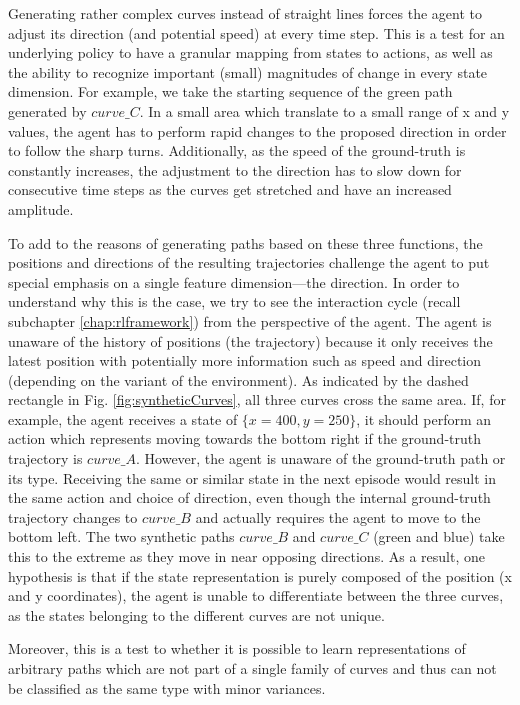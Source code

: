 Generating rather complex curves instead of straight lines forces the agent to adjust its direction (and potential speed) at every time step. This is a test for an underlying policy to have a granular mapping from states to actions, as well as the ability to recognize important (small) magnitudes of change in every state dimension. For example, we take the starting sequence of the green path generated by $curve\_C$. In a small area which translate to a small range of x and y values, the agent has to perform rapid changes to the proposed direction in order to follow the sharp turns. Additionally, as the speed of the ground-truth is constantly increases, the adjustment to the direction has to slow down for consecutive time steps as the curves get stretched and have an increased amplitude.
\par
To add to the reasons of generating paths based on these three functions, the positions and directions of the resulting trajectories challenge the agent to put special emphasis on a single feature dimension—the direction.  In order to understand why this is the case, we try to see the interaction cycle (recall subchapter \ref{chap:rlframework}) from the perspective of the agent. The agent is unaware of the history of positions (the trajectory) because it only receives the latest position with potentially more information such as speed and direction (depending on the variant of the environment). As indicated by the dashed rectangle in Fig. \ref{fig:syntheticCurves}, all three curves cross the same area. If, for example, the agent receives a state of $\{x=400, y=250\}$, it should perform an action which represents moving towards the bottom right if the ground-truth trajectory is $curve\_A$. However, the agent is unaware of the ground-truth path or its type. Receiving the same or similar state in the next episode would result in the same action and choice of direction, even though the internal ground-truth trajectory changes to $curve\_B$ and actually requires the agent to move to the bottom left. The two synthetic paths $curve\_B$ and $curve\_C$ (green and blue) take this to the extreme as they move in near opposing directions. As a result, one hypothesis is that if the state representation is purely composed of the position (x and y coordinates), the agent is unable to differentiate between the three curves, as the states belonging to the different curves are not unique.
\par
Moreover, this is a test to whether it is possible to learn representations of arbitrary paths which are not part of a single family of curves and thus can not be classified as the same type with minor variances.

